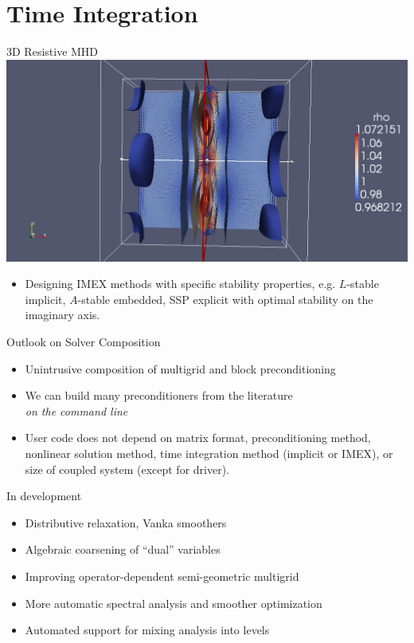 \documentclass{beamer}
\begin{document}
\section{Time Integration}



\begin{frame}{3D Resistive MHD}
  \includegraphics[width=\textwidth]{figures/MHD.png}
  \begin{itemize}
  \item Designing IMEX methods with specific stability properties, e.g. $L$-stable implicit, $A$-stable embedded, SSP explicit with optimal stability on the imaginary axis.
  \end{itemize}
\end{frame}

\begin{frame}{Outlook on Solver Composition}
  \begin{itemize}
  \item Unintrusive composition of multigrid and block preconditioning
  \item We can build many preconditioners from the literature \\
    \emph{on the command line}
  \item User code does not depend on matrix format, preconditioning method, nonlinear solution method, time integration method (implicit or IMEX), or size of coupled system (except for driver).
  \end{itemize}
  \begin{block}{In development}
    \begin{itemize}
    \item Distributive relaxation, Vanka smoothers
    \item Algebraic coarsening of ``dual'' variables
    \item Improving operator-dependent semi-geometric multigrid
    \item More automatic spectral analysis and smoother optimization
    \item Automated support for mixing analysis into levels
  \end{itemize}
\end{block}
\end{frame}
\end{document}
